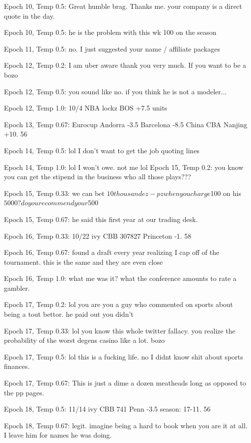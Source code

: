 \documentclass[5p,authoryear]{elsarticle}
\begin{document}
Epoch 10, Temp 0.5:
Great humble brag. Thanks me. your company is a direct quote in the day. 

Epoch 10, Temp 0.5:
he is the problem with this wk 100 on the season 

Epoch 11, Temp 0.5:
no. I just suggested your name / affiliate packages 

Epoch 12, Temp 0.2:
I am uber aware thank you very much. If you want to be a bozo 

Epoch 12, Temp 0.5:
you sound like no. if you think he is not a modeler...

Epoch 12, Temp 1.0:
10/4 NBA lockz BOS +7.5 units

Epoch 13, Temp 0.67:
Eurocup Andorra -3.5 Barcelona -8.5 China CBA Nanjing +10. 56%

Epoch 14, Temp 0.5:
lol I don't want to get the job quoting lines 

Epoch 14, Temp 1.0:
lol I won't owe. not me lol 
Epoch 15, Temp 0.2:
you know you can get the stipend in the business who all those plays??? 

Epoch 15, Temp 0.33:
we can bet $10 thousand ez-pz when you charge $100 on his $5000? do you recommend your $500

Epoch 15, Temp 0.67:
he said this first year at our trading desk.

Epoch 16, Temp 0.33:
10/22 ivy CBB 307827 Princeton -1. 58%

Epoch 16, Temp 0.67:
found a draft every year realizing I cap off of the tournament. this is the same and they are even close 

Epoch 16, Temp 1.0:
what me was it? what the conference amounts to rate a gambler.

Epoch 17, Temp 0.2:
lol you are you a guy who commented on sports about being a tout bettor. he paid out you didn't

Epoch 17, Temp 0.33:
lol you know this whole twitter fallacy. you realize the probability of the worst degens casino like a lot. bozo 

Epoch 17, Temp 0.5:
lol this is a fucking life. no I didnt know shit about sports finances.

Epoch 17, Temp 0.67:
This is just a dime a dozen meatheads long as opposed to the pp pages. 

Epoch 18, Temp 0.5:
11/14 ivy CBB 741 Penn -3.5 season: 17-11. 56%

Epoch 18, Temp 0.67:
legit. imagine being a hard to book when you are it at all. I leave him for names he was doing.
\end{document}
